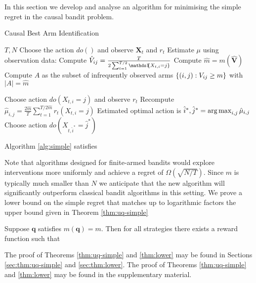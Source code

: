 In this section we develop and analyse an algorithm for minimising the simple regret in the
causal bandit problem.  

\begin{algorithm}[h]
\caption{Causal Best Arm Identification}\label{alg:simple}
\begin{algorithmic}[1]
 $T, N$
\STATE Choose the action $do()$ and observe $\boldsymbol{X}_t$ and $r_t$
\ENDFOR
\STATE Estimate $\mu$ using observation data:
\STATE Compute $\hat V_{ij} = \frac{T}{2 \sum_{t=1}^{T/2}\ind{X_{t,i}=j}} $
\STATE Compute $\hat m = m(\hat{\boldsymbol{V}})$
\STATE Compute $A$ as the subset of infrequently observed arms $\left\{(i,j):V_{ij} \geq m\right\}$ with $|A| = \hat m$

\STATE Choose action $do(X_{t,i} = j)$ and observe $r_t$
\ENDFOR
\STATE Recompute $\hat \mu_{i,j} = \frac{2\hat m}{T} \sum_{t=1}^{ T/2\hat m} r_t(X_{t,i}=j)$ 
\ENDFOR
\STATE Estimated optimal action is $\hat i^*, \hat j^* = \argmax_{i,j} \hat \mu_{i,j}$
\STATE Choose action $do(X_{t,\hat i^*} = \hat j^*)$
\end{algorithmic}
\end{algorithm}

\begin{theorem}\label{thm:uq-simple}
Algorithm \ref{alg:simple} satisfies
\end{theorem}

Note that algorithms designed for finite-armed bandits would explore interventions more uniformly and achieve a regret of $\Omega(\sqrt{N/T})$.
Since $m$ is typically much smaller than $N$ we anticipate that the new algorithm will significantly outperform classical bandit algorithms in
this setting.
We prove a lower bound on the simple regret that matches up to logarithmic factors the upper bound given in Theorem \ref{thm:uq-simple}

\begin{theorem}\label{thm:lower}
Suppose $\boldsymbol{q}$ satisfies $m(\boldsymbol{q}) = m$.
Then for all strategies there exists a reward function such that
\end{theorem}

\ifsup
The proof of Theorems \ref{thm:uq-simple} and \ref{thm:lower} may be found in Sections \ref{sec:thm:uq-simple} and \ref{sec:thm:lower}.
\else
The proof of Theorems \ref{thm:uq-simple} and \ref{thm:lower} may be found in the supplementary material.
\fi



